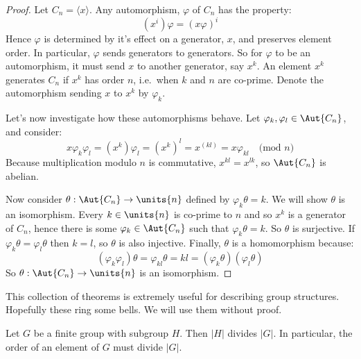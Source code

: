 \begin{proof}
    Let \(C_n = \langle x \rangle\).
    Any automorphism, \(\varphi\) of \(C_n\) has the property:
    \[(x^i)\varphi = {(x\varphi)}^i\]
    Hence \(\varphi\) is determined by it's effect on a generator, \(x\), and preserves element
    order.
    In particular, \(\varphi\) sends generators to generators.
    So for \(\varphi\) to be an automorphism, it must send \(x\) to another generator, say \(x^k\).
    An element \(x^k\) generates \(C_n\) if \(x^k\) has order \(n\), i.e.\ when \(k\) and \(n\) are co-prime.
    Denote the automorphism sending \(x\) to \(x^k\) by \(\varphi_k\).

    Let's now investigate how these automorphisms behave.
    Let \(\varphi_k, \varphi_l \in \Aut{C_n}\), and consider:
    \[x\varphi_k\varphi_l = (x^k)\varphi_l = {(x^k)}^l = x^{(kl)} = x\varphi_{kl} \quad \text{(mod \(n\))}\]
    Because multiplication modulo \(n\) is commutative, \(x^{kl} = x^{lk}\), so \(\Aut{C_n}\) is abelian.

    Now consider \(\theta:\Aut{C_n} \to \units{n}\) defined by \(\varphi_k\theta = k\).
    We will show \(\theta\) is an isomorphism.
    Every \(k \in \units{n}\) is co-prime to \(n\) and so \(x^k\) is a generator of \(C_n\), hence there is some \(\varphi_k
    \in \Aut{C_n}\) such that \(\varphi_k\theta = k\).
    So \(\theta\) is surjective.
    If \(\varphi_k\theta = \varphi_l\theta\) then \(k = l\), so \(\theta\) is also injective.
    Finally, \(\theta\) is a homomorphism because:
    \[(\varphi_k\varphi_l)\theta = \varphi_{kl}\theta = kl = (\varphi_k\theta)(\varphi_l\theta)\]
    So \(\theta:\Aut{C_n} \to \units{n}\) is an isomorphism.
\end{proof}


This collection of theorems is extremely useful for describing group structures.
Hopefully these ring some bells.
We will use them without proof.

\begin{theorem}
    Let \(G\) be a finite group with subgroup \(H\).
    Then \(|H|\) divides \(|G|\).
    In particular, the order of an element of \(G\) must divide \(|G|\).
\end{theorem}

